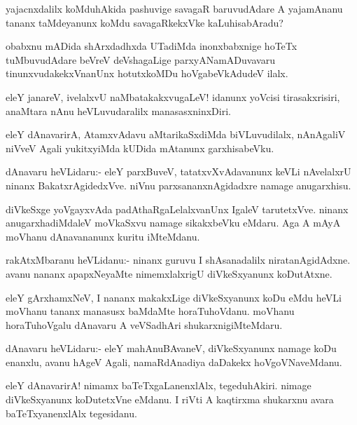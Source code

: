 \documentclass{article}
\begin{document}
\begin{mn}
yajacnxdalilx koMduhAkida pashuvige savagaR baruvudAdare A yajamAnanu
tananx taMdeyanunx koMdu savagaRkekxVke kaLuhisabAradu?
\end{mn}

\begin{mn}
obabxnu mADida shArxdadhxda UTadiMda inonxbabxnige hoTeTx
tuMbuvudAdare beVreV deVshagaLige parxyANamADuvavaru
tinunxvudakekxVnanUnx hotutxkoMDu hoVgabeVkAdudeV ilalx.
\end{mn}

\begin{mn}
eleY janareV, ivelalxvU naMbatakakxvugaLeV! idanunx yoVcisi
tirasakxrisiri, anaMtara nAnu heVLuvudaralilx manasasxninxDiri.
\end{mn}

\begin{mn}
eleY dAnavarirA, AtamxvAdavu aMtarikaSxdiMda biVLuvudilalx, nAnAgaliV
niVveV Agali yukitxyiMda kUDida mAtanunx garxhisabeVku.
\end{mn}

\begin{mn}
dAnavaru heVLidaru:- eleY parxBuveV, tatatxvXvAdavanunx keVLi
nAvelalxrU ninanx BakatxrAgidedxVve. niVnu parxsananxnAgidadxre namage anugarxhisu.
\end{mn}

\begin{mn}
diVkeSxge yoVgayxvAda padAthaRgaLelalxvanUnx IgaleV
tarutetxVve. ninanx anugarxhadiMdaleV moVkaSxvu namage sikakxbeVku
eMdaru. Aga A mAyA moVhanu dAnavananunx kuritu iMteMdanu.
\end{mn}

\begin{mn}
rakAtxMbaranu heVLidanu:- ninanx guruvu I shAsanadalilx
niratanAgidAdxne. avanu nananx apapxNeyaMte nimemxlalxrigU
diVkeSxyanunx koDutAtxne.
\end{mn}

\begin{mn}
eleY gArxhamxNeV, I nananx makakxLige diVkeSxyanunx koDu eMdu heVLi
moVhanu tananx manasusx baMdaMte horaTuhoVdanu. moVhanu horaTuhoVgalu
dAnavaru A veVSadhAri shukarxnigiMteMdaru.
\end{mn}

\begin{mn}%
dAnavaru heVLidaru:- eleY mahAnuBAvaneV, diVkeSxyanunx namage koDu
enanxlu, avanu hAgeV Agali, namaRdAnadiya daDakekx hoVgoVNaveMdanu.
\end{mn}

\begin{mn}
eleY dAnavarirA! nimamx baTeTxgaLanenxlAlx, tegeduhAkiri. nimage
diVkeSxyanunx koDutetxVne eMdanu. I riVti A kaqtirxma shukarxnu avara
baTeTxyanenxlAlx tegesidanu.
\end{mn}
\end{document}
